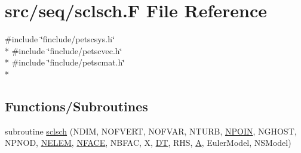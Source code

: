\hypertarget{seq_2sclsch_8_f}{\section{src/seq/sclsch.F File Reference}
\label{seq_2sclsch_8_f}
}
{\ttfamily \#include \char`\"{}finclude/petscsys.\-h\char`\"{}}\\*
{\ttfamily \#include \char`\"{}finclude/petscvec.\-h\char`\"{}}\\*
{\ttfamily \#include \char`\"{}finclude/petscmat.\-h\char`\"{}}\\*
\subsection*{Functions/\-Subroutines}
\begin{DoxyCompactItemize}
\item 
subroutine \hyperlink{seq_2sclsch_8_f_acf48a75f3d22cfc8a73fbca44124b965}{sclsch} (N\-D\-I\-M, N\-O\-F\-V\-E\-R\-T, N\-O\-F\-V\-A\-R, N\-T\-U\-R\-B, \hyperlink{mesh_8com_ae28c1572321efcd8715b974d87d20c58}{N\-P\-O\-I\-N}, N\-G\-H\-O\-S\-T, N\-P\-N\-O\-D, \hyperlink{mesh_8com_aee5e75b79d0e815c0603cfbccc618957}{N\-E\-L\-E\-M}, \hyperlink{mesh_8com_a78142d59d4cbb9fedbede16187658dd3}{N\-F\-A\-C\-E}, N\-B\-F\-A\-C, X, \hyperlink{myts_8com_a41549d5ede5e2b840495daf35608da41}{D\-T}, R\-H\-S, \hyperlink{ibc2_8com_ad2108d58343608772fff791c23da58f5}{A}, Euler\-Model, N\-S\-Model)
\end{DoxyCompactItemize}


